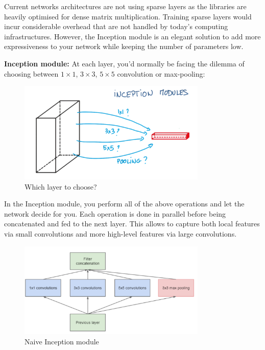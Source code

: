 Current networks architectures are not using sparse layers as the libraries are heavily optimised for dense matrix multiplication. Training sparse layers would incur considerable overhead that are not handled by today's computing infrastructures. However, the Inception module is an elegant solution to add more expressiveness to your network while keeping the number of parameters low. 

\textbf{Inception module:}
At each layer, you'd normally be facing the dilemma of choosing between $1\times 1$, $3\times 3$, $5\times5$ convolution or max-pooling:

\begin{figure}[H]
    \centering
    \includegraphics[width=0.8\textwidth]{Images/inceptionmodule.png}
    \caption{Which layer to choose? \cite{inceptionmodule}}
\end{figure}

In the Inception module, you perform all of the above operations and let the network decide for you. Each operation is done in parallel before being concatenated and fed to the next layer. This allows to capture both local features via small convolutions and more high-level features via large convolutions. 

\begin{figure}[H]
    \centering
    \includegraphics[width=0.8\textwidth]{Images/naiveinception.png}
    \caption{Naive Inception module \cite{googlenet}}
\end{figure}

